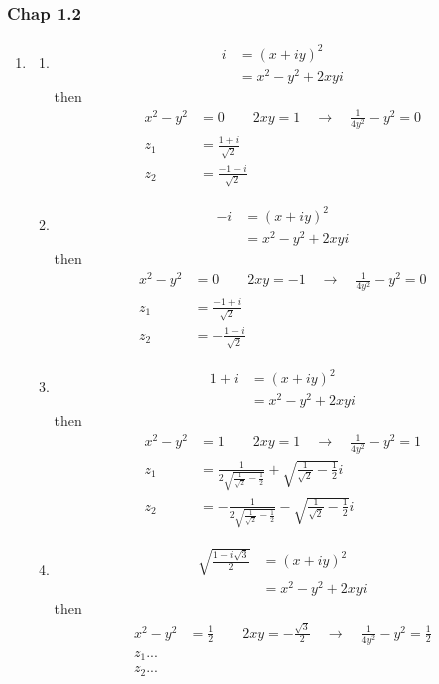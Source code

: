 \documentclass[10pt,a4paper]{book}
\theoremstyle{definition}
\begin{document}
\subsubsection{Chap 1.2}
\begin{enumerate}
\item \begin{enumerate}
\item
\begin{align}
i&=(x+iy)^2\\
&=x^2-y^2+2xyi
\end{align}
then
\begin{align}
x^2-y^2&=0\qquad 2xy=1\quad\rightarrow\quad\frac{1}{4y^2}-y^2=0\\
z_1&=\frac{1+i}{\sqrt{2}}\\
z_2&=\frac{-1-i}{\sqrt{2}}
\end{align}

\item
\begin{align}
-i&=(x+iy)^2\\
&=x^2-y^2+2xyi
\end{align}
then
\begin{align}
x^2-y^2&=0\qquad 2xy=-1\quad\rightarrow\quad\frac{1}{4y^2}-y^2=0\\
z_1&=\frac{-1+i}{\sqrt{2}}\\
z_2&=-\frac{1-i}{\sqrt{2}}
\end{align}

\item
\begin{align}
1+i&=(x+iy)^2\\
&=x^2-y^2+2xyi
\end{align}
then
\begin{align}
x^2-y^2&=1\qquad 2xy=1\quad\rightarrow\quad\frac{1}{4y^2}-y^2=1\\
z_1&=\frac{1}{2\sqrt{\frac{1}{\sqrt{2}}-\frac{1}{2}}}+\sqrt{\frac{1}{\sqrt{2}}-\frac{1}{2}}i\\
z_2&=-\frac{1}{2\sqrt{\frac{1}{\sqrt{2}}-\frac{1}{2}}}-\sqrt{\frac{1}{\sqrt{2}}-\frac{1}{2}}i
\end{align}

\item
\begin{align}
\sqrt{\frac{1-i\sqrt{3}}{2}}&=(x+iy)^2\\
&=x^2-y^2+2xyi
\end{align}
then
\begin{align}
x^2-y^2&=\frac{1}{2}\qquad 2xy=-\frac{\sqrt{3}}{2}\quad\rightarrow\quad\frac{1}{4y^2}-y^2=\frac{1}{2}\\
z_1...\\
z_2...
\end{align}

\end{enumerate}
\end{enumerate}
\end{document}
